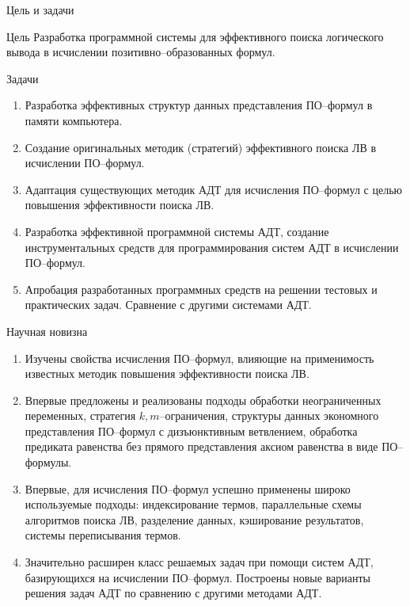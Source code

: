 \documentclass{beamer}
\begin{document}
\begin{frame}{Цель и задачи}

\begin{block}{Цель}
Разработка программной системы для эффективного поиска логического вывода в исчислении позитивно--образованных формул.
\end{block}

\begin{block}{Задачи}
\begin{enumerate}
\item Разработка эффективных структур данных представления ПО--формул в памяти компьютера.
\item Создание оригинальных методик (стратегий) эффективного поиска ЛВ в исчислении ПО--формул.
\item Адаптация существующих методик АДТ для исчисления ПО--формул с целью повышения эффективности поиска ЛВ.
\item Разработка эффективной программной системы АДТ, создание инструментальных средств для программирования систем АДТ в исчислении ПО--формул.
\item Апробация разработанных программных средств на решении тестовых и практических задач. Сравнение с другими системами АДТ.
\end{enumerate}
\end{block}

\end{frame}


\begin{frame}{Научная новизна}
\begin{enumerate}
\item Изучены свойства исчисления ПО--формул, влияющие на применимость известных методик повышения эффективности поиска ЛВ.
\item Впервые предложены и реализованы подходы обработки неограниченных переменных, стратегия $k,m$--ограничения, структуры данных экономного представления ПО--формул с дизъюнктивным ветвлением, обработка предиката равенства без прямого представления аксиом равенства в виде ПО--формулы.
\item Впервые, для исчисления ПО--формул успешно применены широко используемые подходы: индексирование термов, параллельные схемы алгоритмов поиска ЛВ, разделение данных, кэширование результатов, системы переписывания термов.
\item Значительно расширен класс решаемых задач при помощи систем АДТ, базирующихся на исчислении ПО--формул. Построены новые варианты решения задач АДТ по сравнению с другими методами АДТ.
\end{enumerate}
\end{frame}
\end{document}

